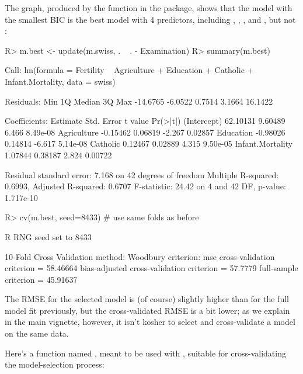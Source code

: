 \documentclass[
]{jss}
\begin{document}
The graph, produced by the  function in the 
package, shows that the model with the smallest BIC is the best model
with 4 predictors, including , ,
, and , but not
:

\begin{CodeChunk}
\begin{CodeInput}
R> m.best <- update(m.swiss, . ~ . - Examination)
R> summary(m.best)
\end{CodeInput}
\begin{CodeOutput}

Call:
lm(formula = Fertility ~ Agriculture + Education + Catholic + 
    Infant.Mortality, data = swiss)

Residuals:
     Min       1Q   Median       3Q      Max 
-14.6765  -6.0522   0.7514   3.1664  16.1422 

Coefficients:
                 Estimate Std. Error t value Pr(>|t|)
(Intercept)      62.10131    9.60489   6.466 8.49e-08
Agriculture      -0.15462    0.06819  -2.267  0.02857
Education        -0.98026    0.14814  -6.617 5.14e-08
Catholic          0.12467    0.02889   4.315 9.50e-05
Infant.Mortality  1.07844    0.38187   2.824  0.00722

Residual standard error: 7.168 on 42 degrees of freedom
Multiple R-squared:  0.6993,    Adjusted R-squared:  0.6707 
F-statistic: 24.42 on 4 and 42 DF,  p-value: 1.717e-10
\end{CodeOutput}
\begin{CodeInput}
R> cv(m.best, seed=8433) # use same folds as before
\end{CodeInput}
\begin{CodeOutput}
R RNG seed set to 8433
\end{CodeOutput}
\begin{CodeOutput}
10-Fold Cross Validation
method: Woodbury
criterion: mse
cross-validation criterion = 58.46664
bias-adjusted cross-validation criterion = 57.7779
full-sample criterion = 45.91637 
\end{CodeOutput}
\end{CodeChunk}

The RMSE for the selected model is (of course) slightly higher than for
the full model fit previously, but the cross-validated RMSE is a bit
lower; as we explain in the main vignette, however, it isn't kosher to
select and cross-validate a model on the same data.

Here's a function named , meant to be used with
, suitable for cross-validating the model-selection
process:
\end{document}
